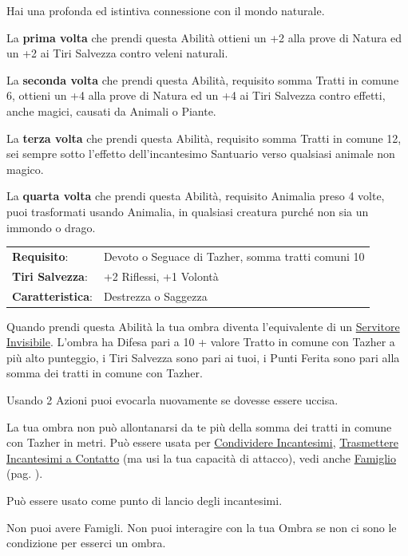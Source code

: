 \begin{multicols}{2}
Hai una profonda ed istintiva connessione con il mondo naturale.

La \textbf{prima volta} che prendi questa Abilità ottieni un +2 alla prove di Natura ed un +2 ai Tiri Salvezza contro veleni naturali.

La \textbf{seconda volta} che prendi questa Abilità, requisito somma Tratti in comune 6, ottieni un +4 alla prove di Natura ed un +4 ai Tiri Salvezza contro effetti, anche magici, causati da Animali o Piante.

La \textbf{terza volta} che prendi questa Abilità, requisito somma Tratti in comune 12, sei sempre sotto l'effetto dell'incantesimo Santuario verso qualsiasi animale non magico.

La \textbf{quarta volta} che prendi questa Abilità, requisito Animalia preso 4 volte, puoi trasformati usando Animalia, in qualsiasi creatura purché non sia un immondo o drago.

\hspace{-0.2cm}\begin{tabularx}{\linewidth}{l@{\hspace{8pt}}X}
\rowcolor{gray!20}\textbf{Requisito}: & Devoto o Seguace di Tazher, somma tratti comuni 10\\
\textbf{Tiri Salvezza}: & +2 Riflessi, +1 Volontà\\
\rowcolor{gray!20}\textbf{Caratteristica}: & Destrezza o Saggezza\\
\end{tabularx}\smallskip

Quando prendi questa Abilità la tua ombra diventa l'equivalente di un \hyperlink{Servitore Invisibile}{Servitore Invisibile}.
L'ombra ha Difesa pari a 10 + valore Tratto in comune con Tazher a più alto punteggio, i Tiri Salvezza sono pari ai tuoi, i Punti Ferita sono pari alla somma dei tratti in comune con Tazher.

Usando 2 Azioni puoi evocarla nuovamente se dovesse essere uccisa.

La tua ombra non può allontanarsi da te più della somma dei tratti in comune con Tazher in metri. Può essere usata per \hyperlink{Condividere Incantesimi}{Condividere Incantesimi}, \hyperlink{Trasmettere Incantesimi a Contatto}{Trasmettere Incantesimi a Contatto} (ma usi la tua capacità di attacco), vedi anche \hyperlink{famiglio}{Famiglio} (pag. \pageref{famiglio}).

Può essere usato come punto di lancio degli incantesimi.

Non puoi avere Famigli. Non puoi interagire con la tua Ombra se non ci sono le condizione per esserci un ombra.


\end{multicols}
